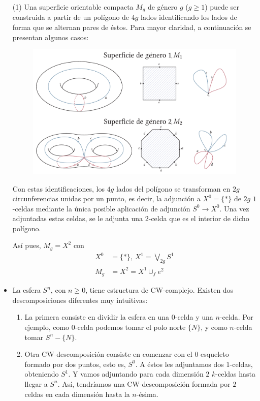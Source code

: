 \begin{ejems}
\begin{itemize}
\item[(1)] Una superficie orientable compacta $M_g$ de género $g$ ($ g \geq 1$) puede ser construida a partir de un polígono de $4g$ lados identificando los lados de forma que se alternan pares de éstos. Para mayor claridad, a continuación se presentan algunos casos: \par
\begin{figure}[h]
\centering
\includegraphics[width=\textwidth]{images/supgeng.pdf}
\end{figure} 
\par 
Con estas identificaciones, los $4g$ lados del polígono se transforman en $2g$ circunferencias unidas por un punto, es decir, la adjunción a $X^0 = \{ \ast \}$ de $2g$ $1$-celdas mediante la única posible aplicación de adjunción $S^0 \longrightarrow X^0$. Una vez adjuntadas estas celdas, se le adjunta una $2$-celda que es el interior de dicho polígono. \par
Así pues, $M_g = X^2$ con 
\begin{align*} 
X^0 &= \{ \ast \} \text{,  } X^1 = \bigvee_{2g} S^1 \\
M_g &= X^2 = X^1 \cup_f e^2
\end{align*}

\item La esfera $S^n$, con $n \geq 0$, tiene estructura de CW-complejo. Existen dos descomposiciones diferentes muy intuitivas: 
\begin{enumerate}
\item La primera consiste en dividir la esfera en una $0$-celda y una $n$-celda. Por ejemplo, como $0$-celda podemos tomar el polo norte $\{N\}$, y como $n$-celda tomar $S^n - \{N\}$.
\item Otra CW-descomposición consiste en comenzar con el $0$-esqueleto formado por dos puntos, esto es, $S^0$. A éstos les adjuntamos dos $1$-celdas, obteniendo $S^1$.  Y vamos adjuntando para cada dimensión $2$ $k$-celdas hasta llegar a $S^n$. Así, tendríamos una CW-descomposición formada por $2$ celdas en cada dimensión hasta la $n$-ésima.
\end{enumerate}


\end{itemize}
\end{ejems}
